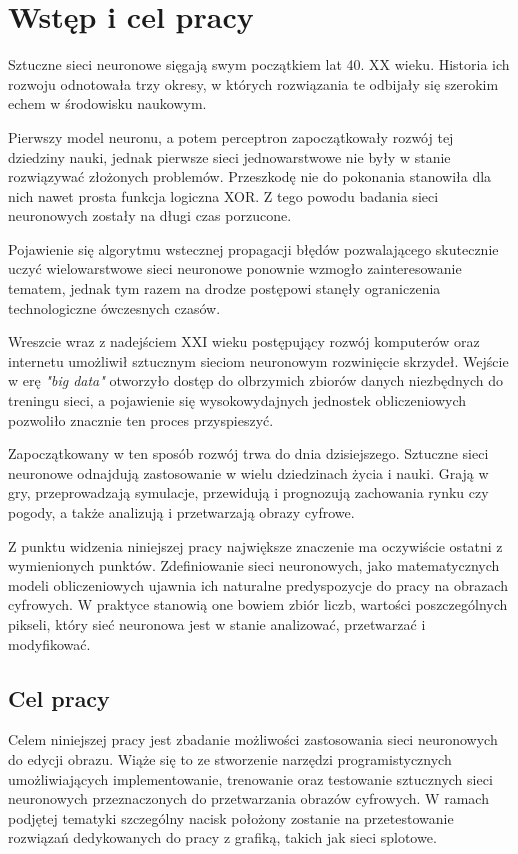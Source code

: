\section{Wstęp i cel pracy}

  Sztuczne sieci neuronowe sięgają swym początkiem lat 40. XX wieku.
  Historia ich rozwoju odnotowała trzy okresy, w których rozwiązania te
  odbijały się szerokim echem w środowisku naukowym.

  Pierwszy model neuronu, a potem perceptron zapoczątkowały
  rozwój tej dziedziny nauki, jednak pierwsze sieci jednowarstwowe nie były w
  stanie rozwiązywać złożonych problemów. Przeszkodę nie do pokonania stanowiła
  dla nich nawet prosta funkcja logiczna XOR. Z tego powodu badania sieci
  neuronowych zostały na długi czas porzucone.

  Pojawienie się algorytmu wstecznej propagacji błędów
  pozwalającego skutecznie uczyć wielowarstwowe sieci neuronowe ponownie
  wzmogło zainteresowanie tematem, jednak tym razem na drodze postępowi stanęły
  ograniczenia technologiczne ówczesnych czasów.

  Wreszcie wraz z nadejściem XXI wieku postępujący rozwój
  komputerów oraz internetu umożliwił sztucznym sieciom neuronowym rozwinięcie
  skrzydeł. Wejście w erę \textit{"big data"} otworzyło dostęp do olbrzymich zbiorów
  danych niezbędnych do treningu sieci, a pojawienie się wysokowydajnych
  jednostek obliczeniowych pozwoliło znacznie ten proces przyspieszyć.

  Zapoczątkowany w ten sposób rozwój trwa do dnia dzisiejszego.
  Sztuczne sieci neuronowe odnajdują zastosowanie w wielu dziedzinach życia i
  nauki. Grają w gry, przeprowadzają symulacje, przewidują i prognozują
  zachowania rynku czy pogody, a także analizują i przetwarzają obrazy cyfrowe.

  Z punktu widzenia niniejszej pracy największe znaczenie ma
  oczywiście ostatni z wymienionych punktów. Zdefiniowanie sieci neuronowych,
  jako matematycznych modeli obliczeniowych ujawnia ich naturalne predyspozycje
  do pracy na obrazach cyfrowych. W praktyce stanowią one bowiem zbiór liczb,
  wartości poszczególnych pikseli, który sieć neuronowa jest w stanie
  analizować, przetwarzać i modyfikować.

  \subsection{Cel pracy}

    Celem niniejszej pracy jest zbadanie możliwości zastosowania sieci neuronowych
    do edycji obrazu. Wiąże się to ze stworzenie narzędzi programistycznych
    umożliwiających implementowanie, trenowanie oraz testowanie sztucznych sieci
    neuronowych przeznaczonych do przetwarzania
    obrazów cyfrowych. W ramach podjętej tematyki szczególny nacisk położony
    zostanie na przetestowanie rozwiązań dedykowanych do pracy z grafiką, takich jak
    sieci splotowe.

